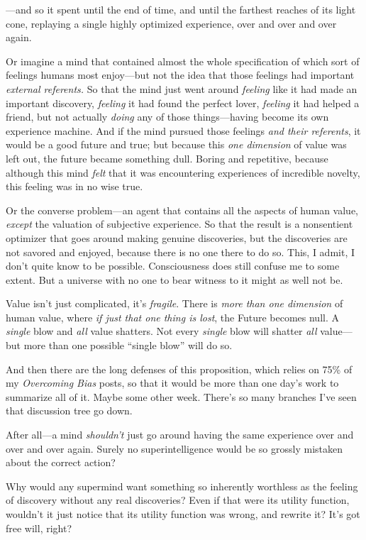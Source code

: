 {
 {}---and so it spent until the end of time, and until the farthest
reaches of its light cone, replaying a single highly optimized
experience, over and over and over again.}

{
 Or imagine a mind that contained almost the whole specification of
which sort of feelings humans most enjoy---but not the idea that those
feelings had important \textit{external referents.} So that the mind
just went around \textit{feeling} like it had made an important
discovery, \textit{feeling} it had found the perfect lover,
\textit{feeling} it had helped a friend, but not actually
\textit{doing} any of those things---having become its own experience
machine. And if the mind pursued those feelings \textit{and their
referents}, it would be a good future and true; but because this
\textit{one dimension} of value was left out, the future became
something dull. Boring and repetitive, because although this mind
\textit{felt} that it was encountering experiences of incredible
novelty, this feeling was in no wise true.}

{
 Or the converse problem---an agent that contains all the aspects
of human value, \textit{except} the valuation of subjective experience.
So that the result is a nonsentient optimizer that goes around making
genuine discoveries, but the discoveries are not savored and enjoyed,
because there is no one there to do so. This, I admit, I
don't quite know to be possible. Consciousness does
still confuse me to some extent. But a universe with no one to bear
witness to it might as well not be.}

{
 Value isn't just complicated, it's
\textit{fragile}. There is \textit{more than one dimension} of human
value, where \textit{if just that one thing is lost}, the Future
becomes null. A \textit{single} blow and \textit{all} value shatters.
Not every \textit{single} blow will shatter \textit{all} value---but
more than one possible ``single
blow'' will do so.}

{
 And then there are the long defenses of this proposition, which
relies on 75\% of my \textit{Overcoming Bias} posts, so that it would
be more than one day's work to summarize all of it.
Maybe some other week. There's so many branches
I've seen that discussion tree go down.}

{
 After all---a mind \textit{shouldn't} just go
around having the same experience over and over and over again. Surely
no superintelligence would be so grossly mistaken about the correct
action?}

{
 Why would any supermind want something so inherently worthless as
the feeling of discovery without any real discoveries? Even if that
were its utility function, wouldn't it just notice that
its utility function was wrong, and rewrite it? It's
got free will, right?}

